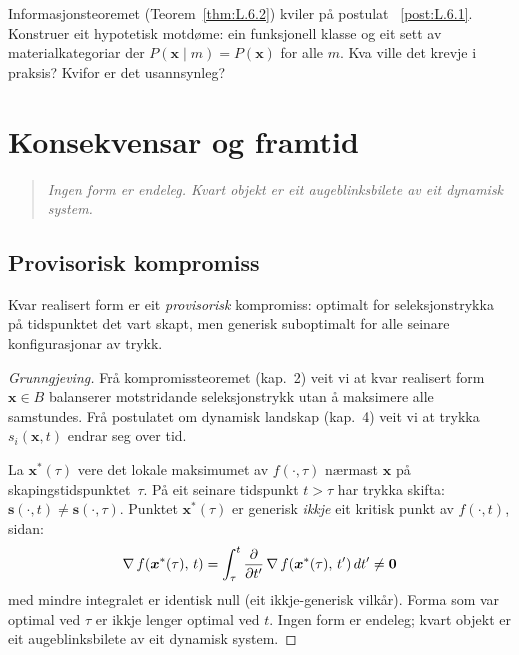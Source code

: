 \begin{exercise}[Nivå 3]\label{ex:8.6}
Informasjonsteoremet (Teorem~\ref{thm:L.6.2}) kviler på postulat~%
\ref{post:L.6.1}. Konstruer eit hypotetisk motdøme: ein
funksjonell klasse og eit sett av materialkategoriar der
$P(\bm{x} \mid m) = P(\bm{x})$ for alle $m$. Kva ville det krevje
i praksis? Kvifor er det usannsynleg?
\end{exercise}


\chapter{Konsekvensar og framtid}
\label{chap:konsekvensar}

\begin{quote}
\itshape
Ingen form er endeleg. Kvart objekt er eit augeblinksbilete
av eit dynamisk system.
\end{quote}


\section{Provisorisk kompromiss}

\begin{satmark}\label{thm:L.9.1}
Kvar realisert form er eit \emph{provisorisk} kompromiss:
optimalt for seleksjonstrykka på tidspunktet det vart skapt,
men generisk suboptimalt for alle seinare konfigurasjonar av trykk.
\end{satmark}

\begin{proof}[Grunngjeving]
Frå kompromissteoremet (kap.~2) veit vi at kvar realisert form
$\bm{x} \in B$ balanserer motstridande seleksjonstrykk utan å
maksimere alle samstundes. Frå postulatet om dynamisk landskap
(kap.~4) veit vi at trykka $s_i(\bm{x}, t)$ endrar seg over tid.

La $\bm{x}^*(\tau)$ vere det lokale maksimumet av $f(\cdot, \tau)$
nærmast $\bm{x}$ på skapingstidspunktet~$\tau$. På eit seinare
tidspunkt $t > \tau$ har trykka skifta:
$\bm{s}(\cdot, t) \neq \bm{s}(\cdot, \tau)$.
Punktet $\bm{x}^*(\tau)$ er generisk \emph{ikkje} eit kritisk
punkt av $f(\cdot, t)$, sidan:
\[
  \operatorname{\nabla} f(\bm{x}^*(\tau),\, t) =
  \int_\tau^t \frac{\partial}{\partial t'}
  \operatorname{\nabla} f(\bm{x}^*(\tau),\, t')\, dt'
  \neq \bm{0}
\]
med mindre integralet er identisk null (eit ikkje-generisk
vilkår). Forma som var optimal ved $\tau$ er ikkje lenger optimal
ved $t$. Ingen form er endeleg; kvart objekt er eit augeblinksbilete
av eit dynamisk system.
\end{proof}

